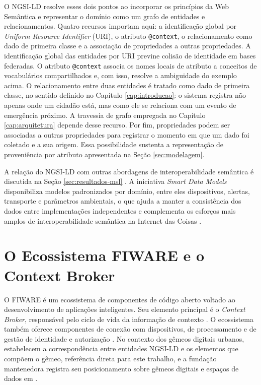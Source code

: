 O NGSI-LD resolve esses dois pontos ao incorporar os princípios da Web Semântica e representar o domínio como um grafo de entidades e relacionamentos. Quatro recursos importam aqui: a identificação global por \textit{Uniform Resource Identifier} (URI), o atributo \texttt{@context}, o relacionamento como dado de primeira classe e a associação de propriedades a outras propriedades. A identificação global das entidades por URI previne colisão de identidade em bases federadas. O atributo \texttt{@context} associa os nomes locais de atributo a conceitos de vocabulários compartilhados e, com isso, resolve a ambiguidade do exemplo acima. O relacionamento entre duas entidades é tratado como dado de primeira classe, no sentido definido no Capítulo \ref{cap:introducao}: o sistema registra não apenas onde um cidadão está, mas como ele se relaciona com um evento de emergência próximo. A travessia de grafo empregada no Capítulo \ref{cap:arquitetura} depende desse recurso. Por fim, propriedades podem ser associadas a outras propriedades para registrar o momento em que um dado foi coletado e a sua origem. Essa possibilidade sustenta a representação de proveniência por atributo apresentada na Seção \ref{sec:modelagem}.

A relação do NGSI-LD com outras abordagens de interoperabilidade semântica é discutida na Seção \ref{sec:resultados-msl} \cite{viola2019mapping,gonzalez2024reshaping}. A iniciativa \textit{Smart Data Models} \cite{smartdatamodels2025} disponibiliza modelos padronizados por domínio, entre eles dispositivos, alertas, transporte e parâmetros ambientais, o que ajuda a manter a consistência dos dados entre implementações independentes e complementa os esforços mais amplos de interoperabilidade semântica na Internet das Coisas \cite{ganzha2017semantic,qamar2019smart}.

\section{O Ecossistema FIWARE e o Context Broker}
\label{sec:fiware}

O FIWARE é um ecossistema de componentes de código aberto voltado ao desenvolvimento de aplicações inteligentes. Seu elemento principal é o \textit{Context Broker}, responsável pelo ciclo de vida da informação de contexto \cite{cirillo2019standard}. O ecossistema também oferece componentes de conexão com dispositivos, de processamento e de gestão de identidade e autorização \cite{bauer2022fiware,salhofer2019building}. No contexto dos gêmeos digitais urbanos,  estabelecem a correspondência entre entidades NGSI-LD e os elementos que compõem o gêmeo, referência direta para este trabalho, e a fundação mantenedora registra seu posicionamento sobre gêmeos digitais e espaços de dados em \cite{ditorrepadula2025smart}.

